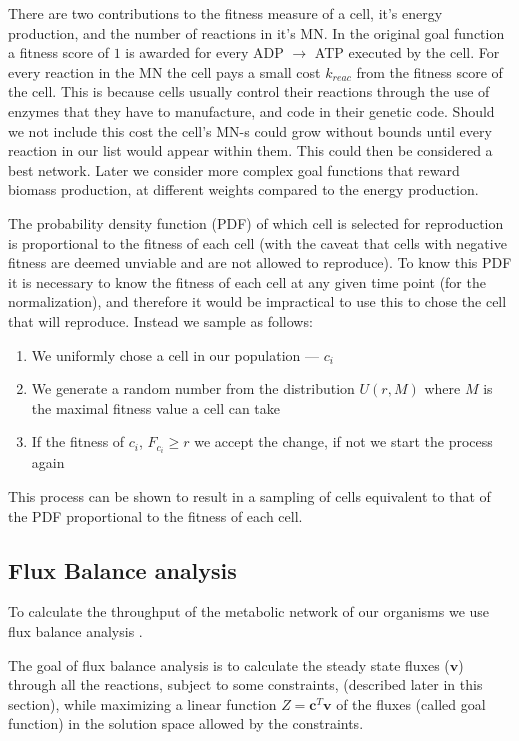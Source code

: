 \documentclass[a4paper,12pt]{article}
\begin{document}
There are two contributions to the fitness measure of a cell, it's energy production, and the number of reactions in it's MN.  In the original goal function a fitness score of $1$ is awarded for every ADP $\rightarrow$ ATP executed by the cell. For every reaction in the MN the cell pays a small cost $k_{reac}$  from the fitness score of the cell. This is because cells usually control their reactions through the use of enzymes that they have to manufacture, and code in their genetic code. Should we not include this cost the cell's MN-s could grow without bounds until every reaction in our list would appear within them. This could then be considered a best network. Later we consider more complex goal functions that reward biomass production, at different weights compared to the energy production. 

The probability density function (PDF) of which cell is selected for reproduction is proportional to the fitness of each cell (with the caveat that cells with negative fitness are deemed unviable and are not allowed to reproduce). To know this PDF it is necessary to know the fitness of each cell at any given time point (for the normalization), and therefore it would be impractical to use this to chose the cell that will reproduce. Instead we sample as follows: 
\begin{enumerate}
	\item We uniformly chose a cell in our population --- $c_i$
	\item We generate a random number from the distribution $U \left( r,M \right)$ where $M$ is the maximal fitness value a cell can take
	\item If the fitness of $c_i$,  $F_{c_i} \geq r$ we accept the change, if not we start the process again
\end{enumerate}

This process can be shown to result in a sampling of cells equivalent to that of the PDF proportional to the fitness of each cell.


\subsection{Flux Balance analysis}
\label{sub:Flux Balance analysis}


	To calculate the throughput of the metabolic network of our organisms we use flux balance analysis \cite{whatisfluxbalance}. 	

	The goal of flux balance analysis is to calculate the steady state fluxes ($\mathbf{v}$) through all the reactions, subject to some constraints, (described later in this section), while maximizing a linear function $Z=\mathbf{c}^T \mathbf{v}$ of the fluxes (called goal function) in the solution space allowed by the constraints. 
\end{document}
